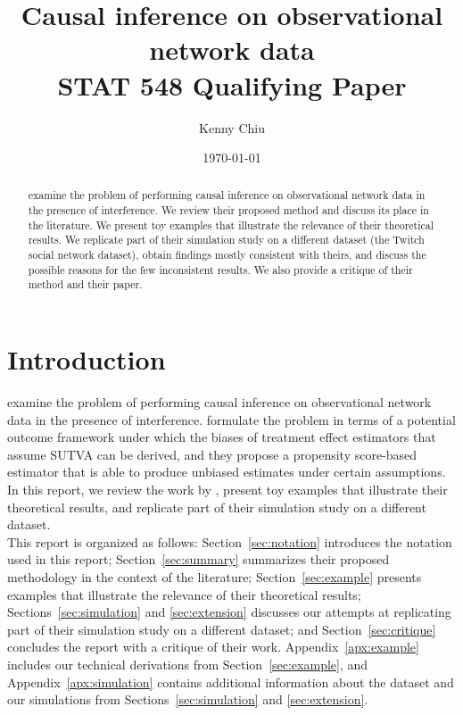 \documentclass[10pt]{article}
\title{Causal inference on observational network data\\\vspace{0.5em}\large{STAT 548 Qualifying Paper}}
\author{Kenny Chiu}
\date{\today}
\begin{document}
\maketitle

\vspace{2em}

\begin{abstract}
\textcite{Forastiere:2021} examine the problem of performing causal inference on observational network data in the presence of interference. We review their proposed method and discuss its place in the literature. We present toy examples that illustrate the relevance of their theoretical results. We replicate part of their simulation study on a different dataset (the Twitch social network dataset), obtain findings mostly consistent with theirs, and discuss the possible reasons for the few inconsistent results. We also provide a critique of their method and their paper.
\end{abstract}

\vspace{2em}


\section{Introduction}

\textcite{Forastiere:2021} examine the problem of performing causal inference on observational network data in the presence of interference. \citeauthor{Forastiere:2021} formulate the problem in terms of a potential outcome framework under which the biases of treatment effect estimators that assume SUTVA can be derived, and they propose a propensity score-based estimator that is able to produce unbiased estimates under certain assumptions. In this report, we review the work by \textcite{Forastiere:2021}, present toy examples that illustrate their theoretical results, and replicate part of their simulation study on a different dataset.
\\

This report is organized as follows: Section~\ref{sec:notation} introduces the notation used in this report; Section~\ref{sec:summary} summarizes their proposed methodology in the context of the literature; Section~\ref{sec:example} presents examples that illustrate the relevance of their theoretical results; Sections~\ref{sec:simulation} and \ref{sec:extension} discusses our attempts at replicating part of their simulation study on a different dataset; and Section~\ref{sec:critique} concludes the report with a critique of their work. Appendix~\ref{apx:example} includes our technical derivations from Section~\ref{sec:example}, and Appendix~\ref{apx:simulation} contains additional information about the dataset and our simulations from Sections~\ref{sec:simulation} and \ref{sec:extension}.
\end{document}
